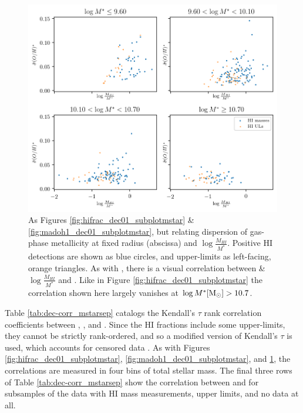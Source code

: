 \begin{figure}
    \centering
    \includegraphics[width=\textwidth]{hifrac_madoh1_subplotmstar}
    \caption[As Figures \ref{fig:hifrac_dec01_subplotmstar} \& \ref{fig:madoh1_dec01_subplotmstar}, but relating dispersion of gas-phase metallicity at fixed radius and .]{As Figures \ref{fig:hifrac_dec01_subplotmstar} \& \ref{fig:madoh1_dec01_subplotmstar}, but relating dispersion of gas-phase metallicity at fixed radius (abscissa) and $\log \frac{M_{HI}}{M^*}$. Positive HI detections are shown as blue circles, and upper-limits as left-facing, orange triangles. As with \metdec, there is a visual correlation between \& $\log \frac{M_{HI}}{M^*}$ and \metdisp. Like in Figure \ref{fig:hifrac_dec01_subplotmstar} the correlation shown here largely vanishes at $\log M^* {\rm [M_{\odot}]} > 10.7$.}
    \label{fig:madoh1_hifrac_subplotmstar}
\end{figure}

Table \ref{tab:dec-corr_mstarsep} catalogs the Kendall's $\tau$ rank correlation coefficients between \metdec, \metdisp, and \hifrac. Since the HI fractions include some upper-limits, they cannot be strictly rank-ordered, and so a modified version of Kendall's $\tau$ is used, which accounts for censored data \citep{akritas_murphy_lavalley_95, akritas_siebert_96, helsel_05_nondetects}. As with Figures \ref{fig:hifrac_dec01_subplotmstar}, \ref{fig:madoh1_dec01_subplotmstar}, and \ref{fig:madoh1_hifrac_subplotmstar}, the correlations are measured in four bins of total stellar mass. The final three rows of Table \ref{tab:dec-corr_mstarsep} show the correlation between \metdec and \metdisp for subsamples of the data with HI mass measurements, upper limits, and no data at all.

